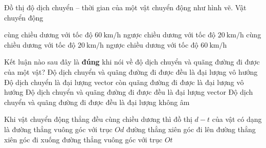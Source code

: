 \begin{ex}
	Đồ thị độ dịch chuyển – thời gian của một vật chuyển động như hình vẽ. Vật chuyển động
	\begin{center}
	\end{center}
	\choice
	{cùng chiều dương với tốc độ $\SI{60}{\kilo\meter/\hour}$}
	{\True ngược chiều dương với tốc độ $\SI{20}{\kilo\meter/\hour}$}
	{cùng chiều dương với tốc độ $\SI{20}{\kilo\meter/\hour}$}
	{ngược chiều dương với tốc độ $\SI{60}{\kilo\meter/\hour}$}
	\loigiai{}
\end{ex}
\begin{ex}
	Kết luận nào sau đây là \textbf{đúng} khi nói về độ dịch chuyển và quãng đường đi được của một vật?	
	\choice
	{Độ dịch chuyển và quãng đường đi được đều là đại lượng vô hướng}
	{\True Độ dịch chuyển là đại lượng vector còn quãng đường đi được là đại lượng vô hướng}
	{Độ dịch chuyển và quãng đường đi được đều là đại lượng vector}
	{Độ dịch chuyển và quãng đường đi được đều là đại lượng không âm}
	\loigiai{}
\end{ex}
\begin{ex}
	Khi vật chuyển động thẳng đều cùng chiều dương thì đồ thị $d - t$ của vật có dạng là
	\choice
	{đường thẳng vuông góc với trục $Od$}
	{\True đường thẳng xiên góc đi lên}
	{đường thẳng xiên góc đi xuống}
	{đường thẳng vuông góc với trục $Ot$}
	\loigiai{}
\end{ex}

